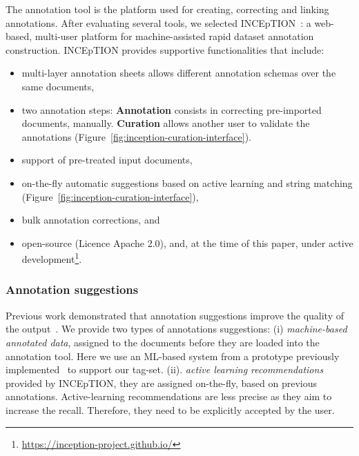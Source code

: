 \documentclass[fleqn,10pt]{wlscirep}
\begin{document}
The annotation tool is the platform used for creating, correcting and linking annotations.
After evaluating several tools, we selected INCEpTION~\cite{tubiblio106270,eckart-de-castilho-etal-2016-web}: a web-based, multi-user platform for machine-assisted rapid dataset annotation construction. 
INCEpTION provides supportive functionalities that include: 
\begin{itemize}
    \item multi-layer annotation sheets allows different annotation schemas over the same documents, 
    \item two annotation steps: \textbf{Annotation} consists in correcting pre-imported documents, manually. \textbf{Curation} allows another user to validate the annotations (Figure~\ref{fig:inception-curation-interface}). 
    \item support of pre-treated input documents,
    \item on-the-fly automatic suggestions based on active learning and string matching (Figure~\ref{fig:inception-curation-interface}), 
    \item bulk annotation corrections, and 
    \item open-source (Licence Apache 2.0), and, at the time of this paper, under active development\footnote{\url{https://inception-project.github.io/}}.
\end{itemize}

\subsubsection*{Annotation suggestions}
\label{subsec:automatic-system-prototype}

Previous work demonstrated that annotation suggestions improve the quality of the output~\cite{Fort2010InfluenceOP,Nvol2011SemiautomaticSA,Lingren2014EvaluatingTI}.
We provide two types of annotations suggestions: (i) \textit{machine-based annotated data}, assigned to the documents before they are loaded into the annotation tool. Here we use an ML-based system from a prototype previously implemented~\cite{foppiano2019proposal} to support our tag-set. (ii). \textit{active learning recommendations} provided by INCEpTION, they are assigned on-the-fly, based on previous annotations. 
Active-learning recommendations are less precise as they aim to increase the recall. Therefore, they need to be explicitly accepted by the user.
\end{document}

